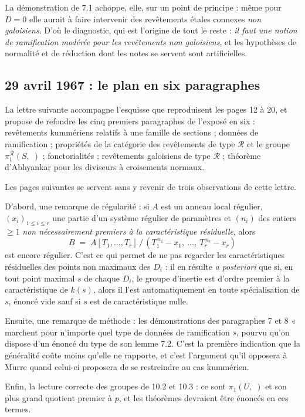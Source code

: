 \documentclass[11pt,a4paper]{article}
\begin{document}
La démonstration de 7.1 achoppe, elle, sur un point de principe : même pour
$D = 0$ elle aurait à faire intervenir des revêtements étales connexes
\emph{non galoisiens}. D'où le diagnostic, qui est l'origine de tout le reste :
\emph{il faut une notion de ramification modérée pour les revêtements non
galoisiens}, et les hypothèses de normalité et de réduction dont les notes se
servent sont artificielles.

\subsection*{29 avril 1967 : le plan en six paragraphes}

La lettre suivante accompagne l'esquisse que reproduisent les pages 12 à 20, et
propose de refondre les cinq premiers paragraphes de l'exposé en six :
revêtements kummériens relatifs à une famille de sections ; données de
ramification ; propriétés de la catégorie des revêtements de type
$\mathcal{R}$ et le groupe $\pi_{1}^{\mathcal{R}}(S,\;)$ ; fonctorialités ;
revêtements galoisiens de type $\mathcal{R}$ ; théorème d'Abhyankar pour les
diviseurs à croisements normaux.

Les pages suivantes se servent sans y revenir de trois observations de cette
lettre.

D'abord, une remarque de régularité : si $A$ est un anneau local régulier,
$(x_{i})_{1 \leqslant i \leqslant r}$ une partie d'un système régulier de
paramètres et $(n_{i})$ des entiers $\geqslant 1$ \emph{non nécessairement
premiers à la caractéristique résiduelle}, alors
\[
  B \;=\; A[T_{1},\dots,T_{r}]\,/\,(T_{1}^{\,n_{1}} - x_{1},\ \dots,\
  T_{r}^{\,n_{r}} - x_{r})
\]
est encore régulier. C'est ce qui permet de ne pas regarder les
caractéristiques résiduelles des points non maximaux des $D_{i}$ : il en
résulte \emph{a posteriori} que si, en tout point maximal $s$ de chaque
$D_{i}$, le groupe d'inertie est d'ordre premier à la caractéristique de
$k(s)$, alors il l'est automatiquement en toute spécialisation de $s$,
énoncé vide sauf si $s$ est de caractéristique nulle.

Ensuite, une remarque de méthode : les démonstrations des paragraphes 7 et 8
« marchent pour n'importe quel type de données de ramification », pourvu qu'on
dispose d'un énoncé du type de son lemme 7.2. C'est la première indication que
la généralité coûte moins qu'elle ne rapporte, et c'est l'argument qu'il
opposera à Murre quand celui-ci proposera de se restreindre au cas kummérien.

Enfin, la lecture correcte des groupes de 10.2 et 10.3 : ce sont
$\pi_{1}(U,\;)$ et son plus grand quotient premier à $p$, et les théorèmes
devraient être énoncés en ces termes.
\end{document}
